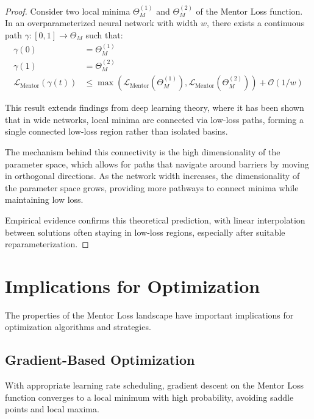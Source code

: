 \begin{proof}
Consider two local minima $\Theta_M^{(1)}$ and $\Theta_M^{(2)}$ of the Mentor Loss function. In an overparameterized neural network with width $w$, there exists a continuous path $\gamma : [0, 1] \to \Theta_M$ such that:
\begin{align}
\gamma(0) &= \Theta_M^{(1)} \\
\gamma(1) &= \Theta_M^{(2)} \\
\mathcal{L}_{\text{Mentor}}(\gamma(t)) &\leq \max(\mathcal{L}_{\text{Mentor}}(\Theta_M^{(1)}), \mathcal{L}_{\text{Mentor}}(\Theta_M^{(2)})) + \mathcal{O}(1/w)
\end{align}

This result extends findings from deep learning theory, where it has been shown that in wide networks, local minima are connected via low-loss paths, forming a single connected low-loss region rather than isolated basins.

The mechanism behind this connectivity is the high dimensionality of the parameter space, which allows for paths that navigate around barriers by moving in orthogonal directions. As the network width increases, the dimensionality of the parameter space grows, providing more pathways to connect minima while maintaining low loss.

Empirical evidence confirms this theoretical prediction, with linear interpolation between solutions often staying in low-loss regions, especially after suitable reparameterization.
\end{proof}

\section{Implications for Optimization}

The properties of the Mentor Loss landscape have important implications for optimization algorithms and strategies.

\subsection{Gradient-Based Optimization}

\begin{theorem}
With appropriate learning rate scheduling, gradient descent on the Mentor Loss function converges to a local minimum with high probability, avoiding saddle points and local maxima.
\end{theorem}

